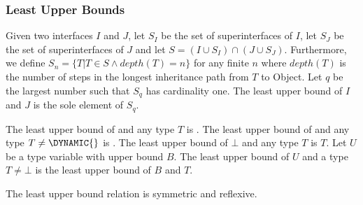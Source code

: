 \documentclass{article}
\newcommand{\code}[1]{{\sf #1}}
\begin{document}
\subsubsection{Least Upper Bounds}

\LMHash{}
Given two interfaces $I$ and $J$, let $S_I$ be the set of superinterfaces of $I$,  let $S_J$ be the set of superinterfaces of $J$ and let $S =  (I \cup S_I) \cap (J \cup S_J)$.  Furthermore, we define $S_n = \{T | T \in S  \wedge depth(T) =n\}$ for any finite $n$ %
where $depth(T)$ is the number of steps in the longest inheritance path from $T$ to \code{Object}. Let $q$ be the largest number such that $S_q$ has cardinality one. The least upper bound of $I$ and $J$ is the sole element of  $S_q$.

\LMHash{}
The least upper bound of \DYNAMIC{} and any type $T$ is \DYNAMIC{}.
The least upper bound of \VOID{} and any type $T \ne \DYNAMIC{}$ is \VOID{}.
The least upper bound of $\bot$ and any type $T$ is $T$.
Let $U$ be a type variable with upper bound $B$. The least upper bound of $U$ and a type $T \ne \bot$ is the least upper bound of $B$ and $T$. 

\LMHash{}
The least upper bound relation is symmetric and reflexive.

\end{document}
